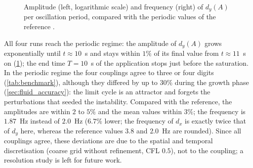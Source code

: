 \documentclass[11pt,a4paper]{article}
\theoremstyle{definition}
\theoremstyle{remark}
\begin{document}
\begin{figure}[ht]\centering
{}\hfill
{}
\caption{Amplitude (left, logarithmic scale) and frequency (right) of $d_y(A)$ per oscillation
period, compared with the periodic values of the reference \cite{TurekHron2006}.}
\label{fig:amplitude_frequency}
\end{figure}

All four runs reach the periodic regime: the amplitude of $d_y(A)$ grows exponentially until
$t\approx10$~s and stays within $1\%$ of its final value from $t\approx11$~s on
(\cref{fig:amplitude_frequency}); the end time $T=10$~s of the application stops just before the
saturation. In the periodic regime the four couplings agree to three or four digits
(\cref{tab:benchmark}), although they differed by up to $30\%$ during the growth phase
(\cref{sec:fluid_accuracy}): the limit cycle is an attractor and forgets the perturbations that
seeded the instability. Compared with the reference, the amplitudes are within $2$ to $5\%$ and the
mean values within $3\%$; the frequency is $1.87$~Hz instead of $2.0$~Hz ($6.7\%$ lower; the
frequency of $d_x$ is exactly twice that of $d_y$ here, whereas the reference values $3.8$ and
$2.0$~Hz are rounded). Since all couplings agree, these deviations are due to the spatial and
temporal discretisation (coarse grid without refinement, CFL $0.5$), not to the coupling; a
resolution study is left for future work.
\end{document}
